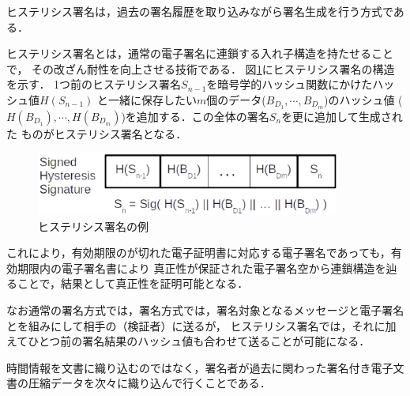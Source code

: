 \documentclass[a4paper,12pt]{jsarticle}
\begin{document}
ヒステリシス署名は，過去の署名履歴を取り込みながら署名生成を行う方式である．

ヒステリシス署名\cite{suzaki}とは，通常の電子署名に連鎖する入れ子構造を持たせることで，
その改ざん耐性を向上させる技術である．
図\ref{fig:hysteresis}にヒステリシス署名の構造を示す．
1つ前のヒステリシス署名$S_{n-1}$を暗号学的ハッシュ関数にかけたハッシュ値$H(S_{n-1})$
と一緒に保存したい$m$個のデータ($B_{D_1}, \cdots, B_{D_m}$)のハッシュ値
($H(B_{D_1}), \cdots, H(B_{D_m})$)を追加する．この全体の署名$S_n$を更に追加して生成された
ものがヒステリシス署名となる．

\begin{figure}[H]%
  \begin{center}
    \includegraphics[width=100mm]{pht/hysteresis_signature.eps}
  \end{center}
  \caption{ヒステリシス署名の例}
  \label{fig:hysteresis}
\end{figure}


これにより，有効期限のが切れた電子証明書に対応する電子署名であっても，有効期限内の電子署名書により
真正性が保証された電子署名空から連鎖構造を辿ることで，結果として真正性を証明可能となる．

なお通常の署名方式では，署名方式では，署名対象となるメッセージと電子署名とを組みにして相手の（検証者）に送るが，
ヒステリシス署名では，それに加えてひとつ前の署名結果のハッシュ値も合わせて送ることが可能になる．

時間情報を文書に織り込むのではなく，署名者が過去に関わった署名付き電子文書の圧縮データを次々に織り込んで行くことである．



\end{document}
